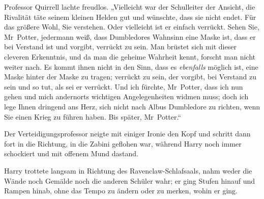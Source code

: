 Professor Quirrell lachte freudlos.
„Vielleicht war der Schulleiter der Ansicht, die Rivalität täte seinem kleinen Helden gut und wünschte, dass sie nicht endet. Für das größere Wohl, Sie verstehen. Oder vielleicht ist er einfach verrückt. Sehen Sie, Mr~Potter, jedermann weiß, dass Dumbledores Wahnsinn eine Maske ist, dass er bei Verstand ist und vorgibt, verrückt zu sein. Man brüstet sich mit dieser cleveren Erkenntnis, und da man die geheime Wahrheit kennt, forscht man nicht weiter nach. Es kommt ihnen nicht in den Sinn, dass es \emph{ebenfalls} möglich ist, eine Maske hinter der Maske zu tragen; verrückt zu sein, der vorgibt, bei Verstand zu sein und so tut, als sei er verrückt. Und ich fürchte, Mr~Potter, dass ich nun gehen und mich andernorts wichtigen Angelegenheiten widmen muss; doch ich lege Ihnen dringend ans Herz, sich nicht nach Albus Dumbledore zu richten, wenn Sie einen Krieg zu führen haben. Bis später, Mr~Potter.“

Der Verteidigungsprofessor neigte mit einiger Ironie den Kopf und schritt dann fort in die Richtung, in die Zabini geflohen war, während Harry noch immer schockiert und mit offenem Mund dastand.


Harry trottete langsam in Richtung des Ravenclaw-Schlafsaals, nahm weder die Wände noch Gemälde noch die anderen Schüler wahr; er ging Stufen hinauf und Rampen hinab, ohne das Tempo zu ändern oder zu merken, wohin er ging.

